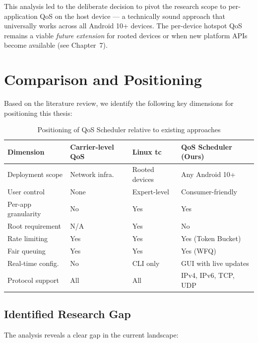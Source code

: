 This analysis led to the deliberate decision to pivot the research scope to per-application QoS on the host device --- a technically sound approach that universally works across all Android 10+ devices. The per-device hotspot QoS remains a viable \textit{future extension} for rooted devices or when new platform APIs become available (see Chapter~7).


\section{Comparison and Positioning}
\label{sec:comparison_positioning}

Based on the literature review, we identify the following key dimensions for positioning this thesis:

\begin{table}[H]
\centering
\caption{Positioning of QoS Scheduler relative to existing approaches}
\label{tab:positioning}
\begin{tabular}{@{}p{3.5cm}p{3cm}p{3cm}p{3.5cm}@{}}
\toprule
\textbf{Dimension} & \textbf{Carrier-level QoS} & \textbf{Linux tc} & \textbf{QoS Scheduler (Ours)} \\
\midrule
Deployment scope & Network infra. & Rooted devices & Any Android 10+ \\
User control & None & Expert-level & Consumer-friendly \\
Per-app granularity & No & Yes & Yes \\
Root requirement & N/A & Yes & No \\
Rate limiting & Yes & Yes & Yes (Token Bucket) \\
Fair queuing & Yes & Yes & Yes (WFQ) \\
Real-time config. & No & CLI only & GUI with live updates \\
Protocol support & All & All & IPv4, IPv6, TCP, UDP \\
\bottomrule
\end{tabular}
\end{table}

\subsection{Identified Research Gap}

The analysis reveals a clear gap in the current landscape:


